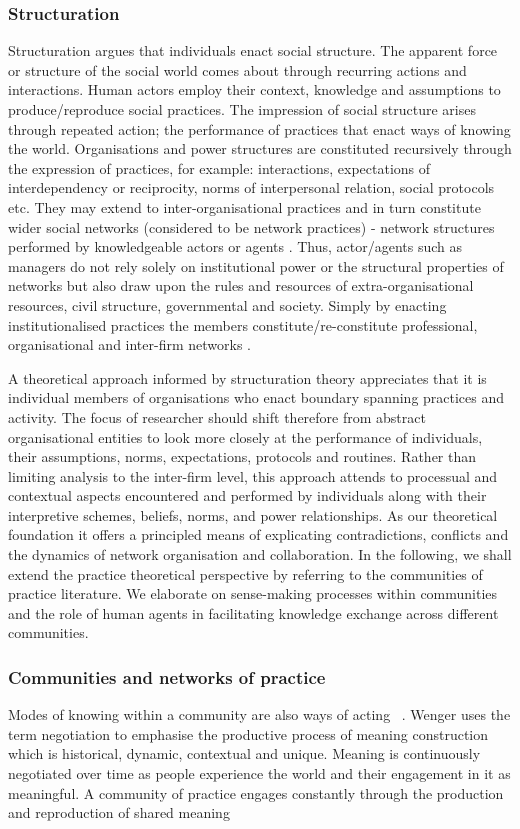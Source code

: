 \documentclass[graybox]{styles/svmult}
\begin{document}
\subsubsection{Structuration}
Structuration argues that individuals enact social structure. The apparent force or structure of the social world comes about through recurring actions and interactions. Human actors employ their context, knowledge and assumptions to produce/reproduce social practices. The impression of social structure arises through repeated action; the performance of practices that enact ways of knowing the world. Organisations and power structures are constituted recursively through the expression of practices, for example: interactions, expectations of interdependency or reciprocity, norms of interpersonal relation, social protocols etc. They may extend to inter-organisational practices and in turn constitute wider social networks (considered to be network practices) - network structures performed by knowledgeable actors or agents \citep{SydWin1998aa}. Thus, actor/agents such as managers do not rely solely on institutional power or the structural properties of networks but also draw upon the rules and resources of extra-organisational resources, civil structure, governmental and society. Simply by enacting institutionalised practices the members constitute/re-constitute professional, organisational and inter-firm networks \citep{schultze2004practice}. 

A theoretical approach informed by structuration theory appreciates that it is individual members of organisations who enact boundary spanning practices and activity. The focus of researcher should shift therefore from abstract organisational entities to look more closely at the performance of individuals, their assumptions, norms, expectations, protocols and routines. 
Rather than limiting analysis to the inter-firm level, this approach attends to processual and contextual aspects encountered and performed by individuals along with their interpretive schemes,  beliefs, norms, and power relationships. As our theoretical foundation it offers a principled means of explicating contradictions, conflicts and the dynamics of network organisation and collaboration. 
In the following, we shall extend the practice theoretical perspective by referring to the communities of practice literature. We elaborate on sense-making processes within communities and the role of human agents in facilitating knowledge exchange across different communities.

\subsubsection{Communities and networks of practice}
Modes of knowing within a community are also ways of acting~ \citep{Wen1999aa}. Wenger uses the term negotiation to emphasise the productive process of meaning construction which is historical, dynamic, contextual and unique. 
Meaning is continuously negotiated over time as people experience the world and their engagement in it as meaningful. A community of practice engages constantly through the production and reproduction of shared meaning
\end{document}
